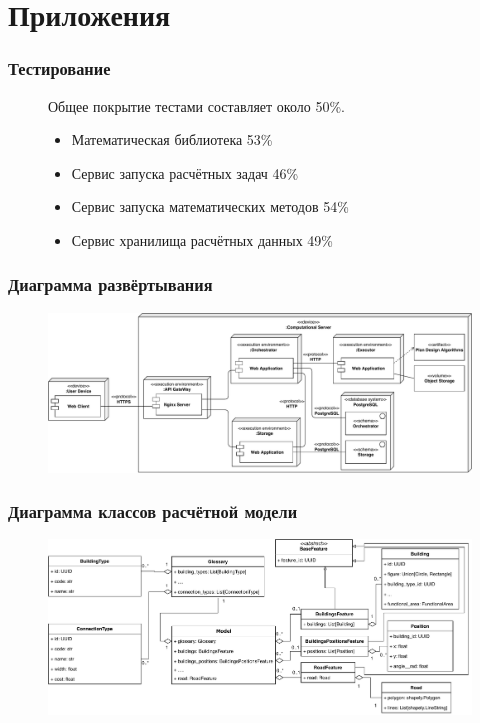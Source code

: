 \appendix
\section{Приложения}

\begin{frame}
\frametitle{Тестирование}
\begin{figure}
Общее покрытие тестами составляет около 50\%.
\begin{itemize}
    \item Математическая библиотека 53\%
    \item Сервис запуска расчётных задач 46\%
    \item Сервис запуска математических методов 54\%
    \item Сервис хранилища расчётных данных 49\%
\end{itemize}
\end{figure}
\end{frame}


\begin{frame}
\frametitle{Диаграмма развёртывания}
\begin{figure}
    \includegraphics[scale=.49]{pictures/architecture/deployment}
\end{figure}
\end{frame}

\begin{frame}
\frametitle{Диаграмма классов расчётной модели}
\begin{figure}
    \includegraphics[scale=.54]{pictures/implementation/appendix_classes}
\end{figure}
\end{frame}

